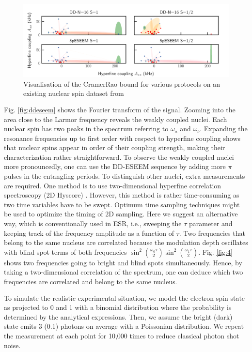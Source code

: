 \documentclass[%
 reprint,
superscriptaddress,
 amsmath,amssymb,
 aps,
]{revtex4-2}
\begin{document}
\label{sec:discussion}
\begin{figure}%
	\begin{center}
		\includegraphics[width=1.0\textwidth]{pict/cov_compare_vad.pdf}
		\caption{Visualisation of the CramerRao bound for various protocols on an existing nuclear spin dataset from \cite{abobeih2019atomic}}
		\label{fig:cov}
	\end{center}
\end{figure}
Fig. \ref{fig:ddeseem} shows the Fourier transform of the signal.
Zooming into the area close to the Larmor frequency reveals the weakly coupled nuclei.
Each nuclear spin has two peaks in the spectrum referring to $\omega_a$ and $\omega_b$. Expanding the resonance frequencies up to first order with respect to hyperfine coupling shows that nuclear spins appear in order of their coupling strength, making their characterization rather straightforward.
To observe the weakly coupled nuclei more pronouncedly, one can use the DD-ESEEM sequence by adding more $\pi$ pulses in the entangling periods.
To distinguish other nuclei, extra measurements are required.
One method is to use two-dimensional hyperfine correlation spectroscopy (2D Hyscore) \cite{vorobyov2022addressing}.
However, this method is rather time-consuming as two time variables have to be swept.
Optimum time sampling techniques might be used to optimize the timing of 2D sampling.
Here we suggest an alternative way, which is conventionally used in ESR, i.e., sweeping the $\tau$ parameter and keeping track of the frequency amplitude as a function of $\tau$.
Two frequencies that belong to the same nucleus are correlated because the modulation depth oscillates with blind spot terms of both frequencies $\sin^2(\frac{\omega_0 \tau}{2}) \sin^2(\frac{\omega_1 \tau}{2})$.
Fig. \ref{fig:4} shows two frequencies going to bright and blind spots simultaneously.
Hence, by taking a two-dimensional correlation of the spectrum, one can deduce which two frequencies are correlated and belong to the same nucleus.

To simulate the realistic experimental situation, we model the electron spin state as projected to 0 and 1 with a binomial distribution where the probability is determined by the analytical expressions. Then, we assume the bright (dark) state emits 3 (0.1) photons on average with a Poissonian distribution. We repeat the measurement at each point for 10,000 times to reduce classical photon shot noise.
\end{document}
